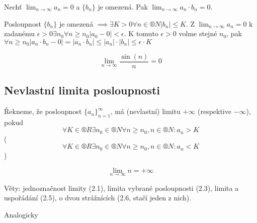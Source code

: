 \documentclass[12pt]{article}					%
\begin{document}
        \begin{veta}
            Nechť $\lim_{n \rightarrow ∞} a_n = 0$ a $\{b_n\}$ je omezená. Pak $\lim_{n \rightarrow ∞} a_n\cdot b_n = 0$.
            \begin{dukazin}
                Posloupnost $\{b_n\}$ je omezená $\implies \exists K > 0 \forall n \in ®N |b_n|≤K$. Z $\lim_{n \rightarrow ∞} a_n = 0$ k zadanému $\epsilon > 0 \exists n_0 \forall n≥n_0 |a_0 - 0| < \epsilon$. K tomuto $\epsilon > 0$ volme stejné $n_0$, pak $\forall n≥n_0 |a_n · b_n-0| = |a_n · b_n|≤|a_n| · |b_n| ≤ \epsilon · K$
            \end{dukazin}

            \begin{prikladyin}
                $$ \lim_{n \rightarrow ∞} \frac{\sin(n)}{n} = 0 $$ 
            \end{prikladyin}
        \end{veta}

    \subsection{Nevlastní limita posloupnosti}
        \begin{definice}
            Řekneme, že posloupnost $\{a_n\}_{n = 1}^∞$, má (nevlastní) limitu $+∞$ (respektive $-∞$), pokud
            $$ \forall K \in ®R \exists n_0 \in ®N \forall n≥n_0, n \in ®N: a_n > K $$ 
            ($$ \forall K \in ®R \exists n_0 \in ®N \forall n≥n_0, n \in ®N: a_n < K $$)
            \begin{prikladyin}
                $$ \lim_{n \rightarrow ∞} n = +∞ $$ 
            \end{prikladyin}
        \end{definice}

        \begin{tvrzeni}
            Věty: jednoznačnost limity (2.1), limita vybrané posloupnosti (2.3), limita a uspořádání (2.5), o dvou strážnících (2.6, stačí jeden z nich).
            \begin{dukazin}
                Analogicky
            \end{dukazin}
        \end{tvrzeni}
        
\end{document}
